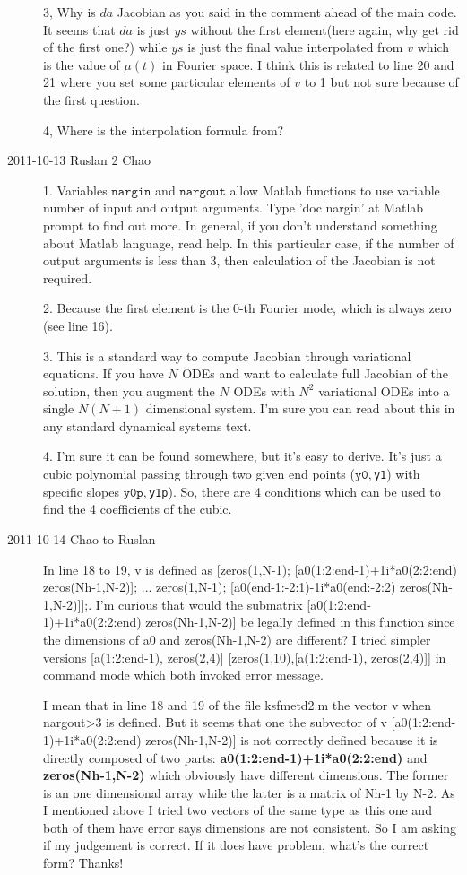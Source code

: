 \begin{description}
3, Why is $\textit{da}$ Jacobian as you said in the comment ahead of the main code. It seems that $\textit{da}$ is just $\textit{ys}$ without the first element(here again, why get rid of the first one?) while $\textit{ys}$ is just the final value interpolated from $\textit{v}$ which is the value of $\mu(t)$ in Fourier space. I think this is related to line 20 and 21 where you set some particular elements of $\textit{v}$ to 1 but not sure because of the first question.

4, Where is the interpolation formula from?

\item[2011-10-13 Ruslan 2 Chao]

1. Variables $\texttt{nargin}$ and $\texttt{nargout}$ allow Matlab functions to use variable number of input and output arguments.  Type 'doc nargin' at Matlab prompt to find out more.  In general, if you don't understand something about Matlab language, read help.  In this particular case, if the number of output arguments is less than 3, then calculation of the Jacobian is not required.

2. Because the first element is the 0-th Fourier mode, which is always zero (see line 16).

3. This is a standard way to compute Jacobian through variational equations.  If you have $N$ ODEs and want to calculate full Jacobian of the solution, then you augment the $N$ ODEs with $N^2$ variational ODEs into a single $N(N+1)$ dimensional system.  I'm sure you can read about this in any standard dynamical systems text.

4. I'm sure it can be found somewhere, but it's easy to derive.  It's just a cubic polynomial passing through two given end points ($\texttt{y0}, $\texttt{y1}) with specific slopes $\texttt{y0p}, $\texttt{y1p}).  So, there are 4 conditions which can be used to find the 4 coefficients of the cubic.

\item[2011-10-14 Chao to Ruslan]
In line 18 to 19, v is defined as [zeros(1,N-1); [a0(1:2:end-1)+1i*a0(2:2:end) zeros(Nh-1,N-2)]; ...
zeros(1,N-1); [a0(end-1:-2:1)-1i*a0(end:-2:2) zeros(Nh-1,N-2)]];. I'm curious that would the submatrix [a0(1:2:end-1)+1i*a0(2:2:end) zeros(Nh-1,N-2)] be legally defined in this function since the dimensions of a0 and zeros(Nh-1,N-2) are different? I tried simpler versions [a(1:2:end-1), zeros(2,4)] [zeros(1,10),[a(1:2:end-1), zeros(2,4)]] in command mode which both invoked error message.

I mean that in line 18 and 19 of the file ksfmetd2.m the vector v when nargout>3 is defined. But it seems that one the subvector of v [a0(1:2:end-1)+1i*a0(2:2:end) zeros(Nh-1,N-2)] is not correctly defined because it is directly composed of two parts: \textbf{a0(1:2:end-1)+1i*a0(2:2:end)} and \textbf{zeros(Nh-1,N-2)} which obviously have different dimensions. The former is an one dimensional array while the latter is a matrix of Nh-1 by N-2. As I mentioned above I tried two vectors of the same type as this one and both of them have error says dimensions are not consistent. So I am asking if my judgement is correct. If it does have problem, what's the correct form? Thanks!


\end{description}
